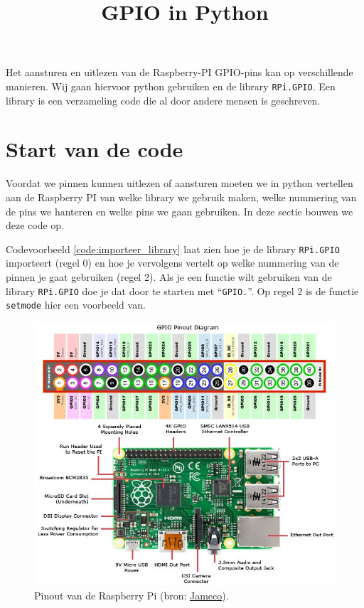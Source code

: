 \documentclass{guide}
\title{GPIO in Python}
\begin{document}
Het aansturen en uitlezen van de Raspberry-PI GPIO-pins kan op verschillende manieren. Wij gaan hiervoor python gebruiken en de library \texttt{RPi.GPIO}. Een library is een verzameling code die al door andere mensen is geschreven.

\section{Start van de code}
\label{sec:start_code}
Voordat we pinnen kunnen uitlezen of aansturen moeten we in python vertellen aan de Raspberry PI van welke library we gebruik maken, welke nummering van de pins we hanteren en welke pins we gaan gebruiken. In deze sectie bouwen we deze code op.

Codevoorbeeld \ref{code:importeer_library} laat zien hoe je de library \texttt{RPi.GPIO} importeert (regel 0) en hoe je vervolgens vertelt op welke nummering van de pinnen je gaat gebruiken (regel 2). Als je een functie wilt gebruiken van de library \texttt{RPi.GPIO} doe je dat door te starten met \enquote{\texttt{GPIO.}}. Op regel 2 is de functie \texttt{setmode} hier een voorbeeld van.

\begin{figure}[h]
  \centering
  \includegraphics[width=\textwidth]{images/pinout.png}
  \caption{Pinout van de Raspberry Pi (bron: \href{https://www.jameco.com/Jameco/workshop/circuitnotes/raspberry-pi-circuit-note.html}{Jameco}).} \label{fig:pinout}
\end{figure}
\end{document}
